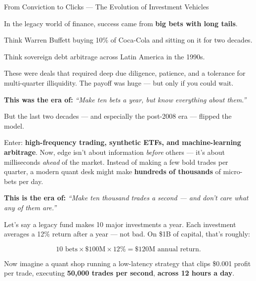 \begin{HistoricalSidebar}{From Conviction to Clicks --- The Evolution of Investment Vehicles}

  In the legacy world of finance, success came from \textbf{big bets with long tails}.

  \medskip
  
  Think Warren Buffett buying 10\% of Coca-Cola and sitting on it for two decades.  

  \medskip
  

  Think sovereign debt arbitrage across Latin America in the 1990s.  

  \medskip
  

  These were deals that required deep due diligence, patience, and a tolerance for multi-quarter illiquidity. The payoff was huge — but only if you could wait.

  \medskip
  
  \textbf{This was the era of:}  
  \textit{“Make ten bets a year, but know everything about them.”}

  \medskip
  
  But the last two decades — and especially the post-2008 era — flipped the model.

  \medskip
  
  Enter: \textbf{high-frequency trading, synthetic ETFs, and machine-learning arbitrage}.  
  Now, edge isn’t about information \textit{before} others — it’s about milliseconds \textit{ahead} of the market.  
  Instead of making a few bold trades per quarter, a modern quant desk might make \textbf{hundreds of thousands} of micro-bets per day.

  \medskip
  
  \textbf{This is the era of:}  
  \textit{“Make ten thousand trades a second — and don’t care what any of them are.”}

  \medskip
  
  Let’s say a legacy fund makes 10 major investments a year.  
  Each investment averages a 12\% return after a year — not bad.  
  On \$1B of capital, that’s roughly:
  
  \[
  10 \text{ bets} \times \$100\text{M} \times 12\% = \$120\text{M annual return}.
  \]
  
  Now imagine a quant shop running a low-latency strategy that clips \$0.001 profit per trade,  
  executing \textbf{50{,}000 trades per second}, \textbf{across 12 hours a day}.

  \medskip
  

\end{HistoricalSidebar}
